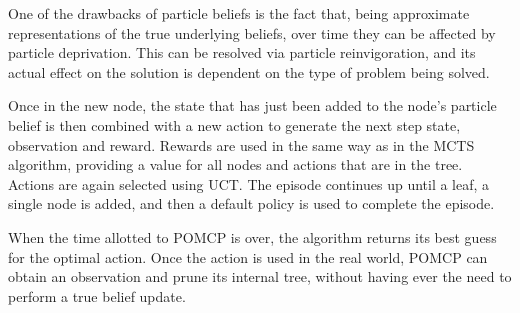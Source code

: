 One of the drawbacks of particle beliefs is the fact that, being approximate representations of the
true underlying beliefs, over time they can be affected by particle deprivation. This can be
resolved via particle reinvigoration, and its actual effect on the solution is dependent on the type
of problem being solved.

Once in the new node, the state that has just been added to the node's particle belief is then
combined with a new action to generate the next step state, observation and reward. Rewards are used
in the same way as in the MCTS algorithm, providing a value for all nodes and actions that are in
the tree. Actions are again selected using UCT. The episode continues up until a leaf, a single node
is added, and then a default policy is used to complete the episode.

When the time allotted to POMCP is over, the algorithm returns its best guess for the optimal
action. Once the action is used in the real world, POMCP can obtain an observation and prune its
internal tree, without having ever the need to perform a true belief update.
